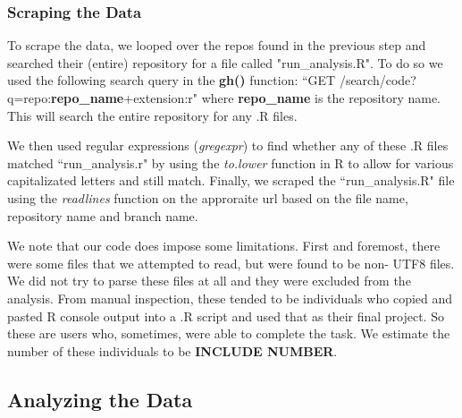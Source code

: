 \documentclass[12pt]{article}\usepackage[]{graphicx}\usepackage[]{color}
\begin{document}
\subsubsection{Scraping the Data}

To scrape the data, we looped over the repos found in the previous step and searched their (entire) repository for a file 
called "run\_analysis.R". To do so we used the following search query in the \textbf{gh()} function: 
``GET /search/code?q=repo:\textbf{repo\_name}+extension:r" where \textbf{repo\_name} is the repository name. 
This will search the entire repository for any .R files. 

We then used regular expressions ({\it gregexpr}) to find whether 
any of these .R files matched ``run\_analysis.r" by using the {\it to.lower}
function in R to allow for various capitalizated letters and 
still match. Finally, we scraped the ``run\_analysis.R" file using the {\it readlines} 
function on the approraite url based on the file name, repository name 
and branch name.

We note that our code does impose some limitations. First and foremost, there were some files that we attempted to read, but 
were found to be non- UTF8 files. We did not try to parse these files at all and they were excluded from the analysis. 
From manual inspection, these tended to be individuals who copied and pasted R console output into a .R script and used that as 
their final project. So these are users who, sometimes, were able to complete the task. 
We estimate the number of these individuals to be \textbf{INCLUDE NUMBER}.




\subsection{Analyzing the Data}
















% 
% 
% 
\end{document}
